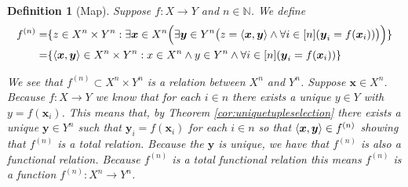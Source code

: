 \documentclass[12pt]{article}
\theoremstyle{break}
\newtheorem{definition}{Definition}[section]
\theoremstyle{break}
\theoremstyle{break}
\theoremstyle{break}
\theoremstyle{break}
\newtheorem{informal definition}[definition]{Informal Definition}
\newcommand{\bv}[1]{\boldsymbol{#1}}
\begin{document}
\begin{definition}[Map]
Suppose $f:X \to Y$ and $n\in \mathbb{N}$.
We define
\begin{align}
f^{(n)} =& \{z \in X^n \times Y^n: \exists \bv{x} \in X^n \Big(\exists \bv{y} \in Y^n \big(z=\braket{\bv{x}, \bv{y}} \land \forall i \in [n]( \bv{y}_i = f(\bv{x}_i))\big)\Big)\}\\
=& \{\braket{\bv{x}, \bv{y}} \in X^n \times Y^n: x\in X^n \land y \in Y^n \land \forall i \in [n] (\bv{y}_i = f(\bv{x}_i))\}
\end{align}

We see that $f^{(n)}\subset X^n \times Y^n$ is a relation between $X^n$ and $Y^n$.
Suppose $\boldsymbol{x}\in X^n$.
Because $f:X \to Y$ we know that for each $i\in n$ there exists a unique $y\in Y$ with $y=f(\bv{x}_i)$.
This means that, by Theorem \ref{cor:uniquetupleselection} there exists a unique $\bv{y}\in Y^n$ such that $\bv{y}_i = f(\bv{x}_i)$ for each $i\in n$ so that $\braket{\bv{x}, \bv{y}}\in f^{(n)}$ showing that $f^{(n)}$ is a total relation.
Because the $\bv{y}$ is unique, we have that $f^{(n)}$ is also a functional relation.
Because $f^{(n)}$ is a total functional relation this means $f^{(n)}$ is a function $f^{(n)}:X^n \to Y^n$.
\end{definition}
\end{document}
